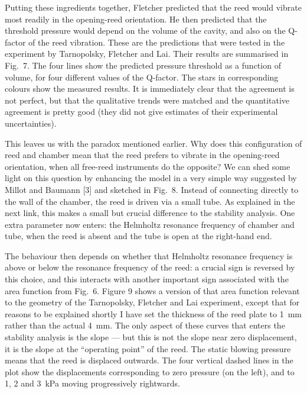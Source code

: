   Putting these ingredients together, Fletcher predicted that the reed would 
  vibrate most readily in the opening-reed orientation. He then predicted that 
  the threshold pressure would depend on the volume of the cavity, and also on 
  the Q-factor of the reed vibration. These are the predictions that were 
  tested in the experiment by Tarnopolsky, Fletcher and Lai. Their results are 
  summarised in Fig.\ 7. The four lines show the predicted pressure threshold 
  as a function of volume, for four different values of the Q-factor. The stars 
  in corresponding colours show the measured results. It is immediately clear 
  that the agreement is not perfect, but that the qualitative trends were 
  matched and the quantitative agreement is pretty good (they did not give 
  estimates of their experimental uncertainties). 


  This leaves us with the paradox mentioned earlier. Why does this 
  configuration of reed and chamber mean that the reed prefers to vibrate in 
  the opening-reed orientation, when all free-reed instruments do the opposite? 
  We can shed some light on this question by enhancing the model in a very 
  simple way suggested by Millot and Baumann [3] and sketched in Fig.\ 8. 
  Instead of connecting directly to the wall of the chamber, the reed is driven 
  via a small tube. As explained in the next link, this makes a small but 
  crucial difference to the stability analysis. One extra parameter now enters: 
  the Helmholtz resonance frequency of chamber and tube, when the reed is 
  absent and the tube is open at the right-hand end. 


  The behaviour then depends on whether that Helmholtz resonance frequency is 
  above or below the resonance frequency of the reed: a crucial sign is 
  reversed by this choice, and this interacts with another important sign 
  associated with the area function from Fig.\ 6. Figure 9 shows a version of 
  that area function relevant to the geometry of the Tarnopolsky, Fletcher and 
  Lai experiment, except that for reasons to be explained shortly I have set 
  the thickness of the reed plate to 1~mm rather than the actual 4~mm. The only 
  aspect of these curves that enters the stability analysis is the slope — but 
  this is not the slope near zero displacement, it is the slope at the 
  “operating point” of the reed. The static blowing pressure means that the 
  reed is displaced outwards. The four vertical dashed lines in the plot show 
  the displacements corresponding to zero pressure (on the left), and to 1, 2 
  and 3~kPa moving progressively rightwards. 

